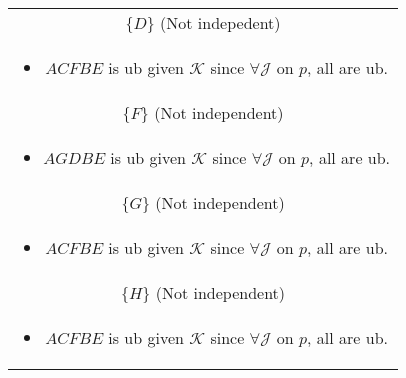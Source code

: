 \begin{example}
\begin{center}
\begin{tabular}{c}
            \midrule
            $\{D\}$ (Not indepedent) \\
            \multicolumn{1}{p{\linewidth}}{
                \begin{itemize}
                    \item $ACFBE$ is ub given $\mathcal{K}$ since $\forall \mathcal{J}$ on $p$, all are ub.
                \end{itemize}} \\
            \midrule
            $\{F\}$ (Not independent) \\
            \multicolumn{1}{p{\linewidth}}{
                \begin{itemize}
                    \item $AGDBE$ is ub given $\mathcal{K}$ since $\forall \mathcal{J}$ on $p$, all are ub.
                \end{itemize}} \\
            \midrule
            $\{G\}$ (Not independent) \\
            \multicolumn{1}{p{\linewidth}}{
                \begin{itemize}
                    \item $ACFBE$ is ub given $\mathcal{K}$ since $\forall \mathcal{J}$ on $p$, all are ub.
                \end{itemize}} \\
            \midrule
            $\{H\}$ (Not independent) \\
            \multicolumn{1}{p{\linewidth}}{
                \begin{itemize}
                    \item $ACFBE$ is ub given $\mathcal{K}$ since $\forall \mathcal{J}$ on $p$, all are ub.
                \end{itemize}} \\
            \toprule
        \end{tabular}
    \end{center}
\end{example}
\newpage

